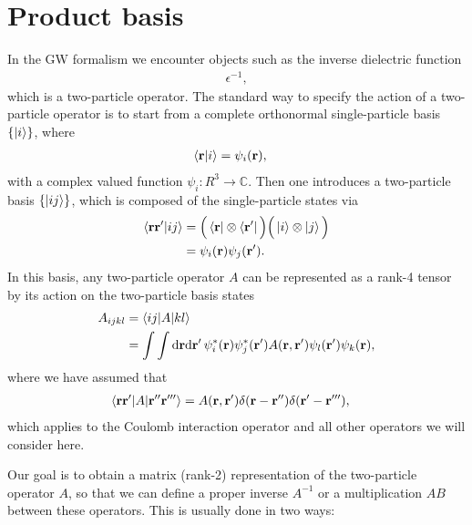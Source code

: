 \documentclass[12pt,a4paper]{scrartcl}
\numberwithin{equation}{section}
\renewcommand{\vec}{\mathbf}
\begin{document}
\section{Product basis}
In the GW formalism we encounter objects such as the inverse dielectric function
\begin{align}
 \epsilon^{-1},
\end{align}
which is a two-particle operator. The standard way to specify the action of a two-particle operator
is to start from a complete orthonormal single-particle basis $\{ \ket{i} \}$, where
\begin{align}
 \braket{\vec{r} | i} &= \psi_i(\vec{r}),
\end{align}
with a complex valued function $\psi_i: R^3\rightarrow \mathbb{C}$.
Then one introduces a two-particle basis $\{ \ket{ij} \}$, which is composed of the single-particle states via
\begin{align}
\braket{\vec{r}\vec{r}' | ij} 
&= \Big( \bra{\vec{r}} \otimes \bra{\vec{r}'} \Big) \Big( \ket{i} \otimes \ket{j} \Big) \\
&= \psi_i(\vec{r})\psi_j(\vec{r}').
\end{align}
In this basis, any two-particle operator $A$ can be represented as a rank-4 tensor
by its action on the two-particle basis states
\begin{align}
A_{ijkl} &= \braket{ij | A | kl }  \\
&= \int \int \mathrm{d}\vec{r}\mathrm{d}\vec{r}' \, \psi^*_i(\vec{r})\psi^*_j(\vec{r}') 
                                          A(\vec{r},\vec{r}') \psi_l(\vec{r}')\psi_k(\vec{r}),
\end{align}
where we have assumed that 
\begin{align}
 \braket{\vec{r}\vec{r}' | A | \vec{r}''\vec{r}''' }
 &= A(\vec{r},\vec{r}') \delta(\vec{r}-\vec{r}'') \delta(\vec{r}'-\vec{r}'''),
\end{align}
which applies to the Coulomb interaction operator and all other operators we will consider here.

Our goal is to obtain a matrix (rank-2) representation of the two-particle operator $A$, so that we can 
define a proper inverse $A^{-1}$ or a multiplication $AB$ between these operators. 
This is usually done in two ways:

\end{document}
